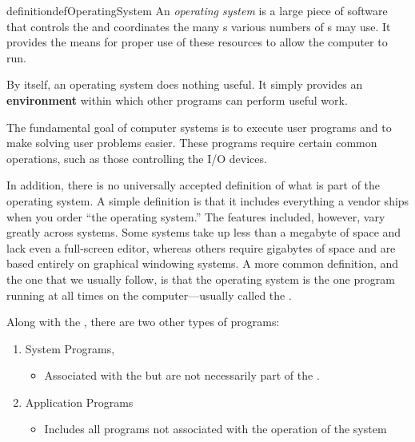 \begin{restatable}{definition}{defOperatingSystem}\label{def:Operating_System}
  An \emph{operating system} is a large piece of software that controls the  and coordinates the many s various numbers of s may use.
  It provides the means for proper use of these resources to allow the computer to run.

  By itself, an operating system does nothing useful.
  It simply provides an \textbf{environment} within which other programs can perform useful work.

  The fundamental goal of computer systems is to execute user programs and to make solving user problems easier.
  These programs require certain common operations, such as those controlling the I/O devices.

  In addition, there is no universally accepted definition of what is part of the operating system.
  A simple definition is that it includes everything a vendor ships when you order ``the operating system.''
  The features included, however, vary greatly across systems.
  Some systems take up less than a megabyte of space and lack even a full-screen editor, whereas others require gigabytes of space and are based entirely on graphical windowing systems.
  A more common definition, and the one that we usually follow, is that the operating system is the one program running at all times on the computer—usually called the .

  \begin{remark}\label{rmk:Kernel_Level_Non_Kernel_Programs}
    Along with the , there are two other types of programs:
    \begin{enumerate}[noitemsep]
    \item System Programs,
      \begin{itemize}[noitemsep]
      \item Associated with the  but are not necessarily part of the .
      \end{itemize}
    \item Application Programs
      \begin{itemize}[noitemsep]
      \item Includes all programs not associated with the operation of the system
      \end{itemize}
    \end{enumerate}
  \end{remark}
\end{restatable}

